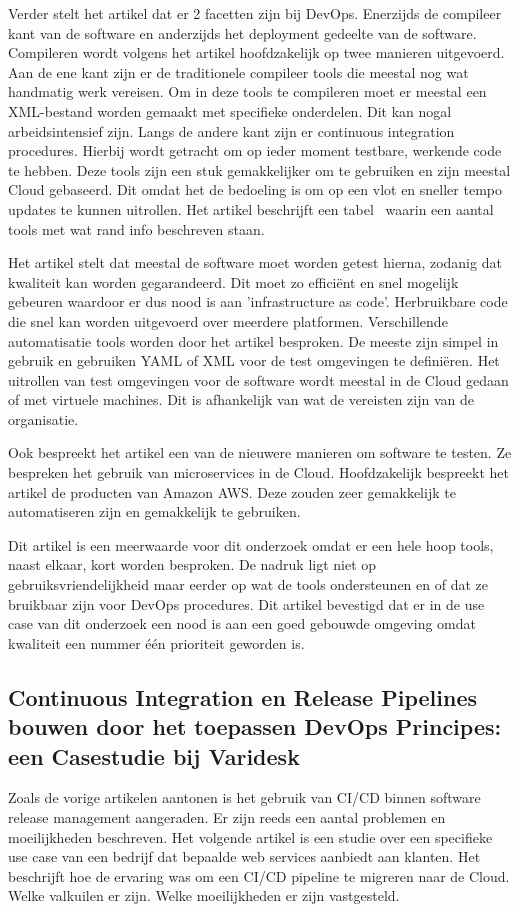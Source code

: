 Verder stelt het artikel \autocite{Ebert2016} dat er 2 facetten zijn bij DevOps. Enerzijds de compileer kant van de software en anderzijds het deployment gedeelte van de software. Compileren wordt volgens het artikel hoofdzakelijk op twee manieren uitgevoerd. Aan de ene kant zijn er de traditionele compileer tools die meestal nog wat handmatig werk vereisen. Om in deze tools te compileren moet er meestal een XML-bestand worden gemaakt met specifieke onderdelen. Dit kan nogal arbeidsintensief zijn. Langs de andere kant zijn er continuous integration procedures. Hierbij wordt getracht om op ieder moment testbare, werkende code te hebben. Deze tools zijn een stuk gemakkelijker om te gebruiken en zijn meestal Cloud gebaseerd. Dit omdat het de bedoeling is om op een vlot en sneller tempo updates te kunnen uitrollen. Het artikel beschrijft een tabel~\textcite{Ebert2016} waarin een aantal tools met wat rand info beschreven staan.

Het artikel \autocite{Ebert2016} stelt dat meestal de software moet worden getest hierna, zodanig dat kwaliteit kan worden gegarandeerd. Dit moet zo efficiënt en snel mogelijk gebeuren waardoor er dus nood is aan 'infrastructure as code'. Herbruikbare code die snel kan worden uitgevoerd over meerdere platformen. Verschillende automatisatie tools worden door het artikel besproken. De meeste zijn simpel in gebruik en gebruiken YAML of XML voor de test omgevingen te definiëren. Het uitrollen van test omgevingen voor de software wordt meestal in de Cloud gedaan of met virtuele machines. Dit is afhankelijk van wat de vereisten zijn van de organisatie. 

Ook bespreekt het artikel \autocite{Ebert2016} een van de nieuwere manieren om software te testen. Ze bespreken het gebruik van microservices in de Cloud. Hoofdzakelijk bespreekt het artikel de producten van Amazon AWS. Deze zouden zeer gemakkelijk te automatiseren zijn en gemakkelijk te gebruiken.

Dit artikel \autocite{Ebert2016} is een meerwaarde voor dit onderzoek omdat er een hele hoop tools, naast elkaar, kort worden besproken. De nadruk ligt niet op gebruiksvriendelijkheid maar eerder op wat de tools ondersteunen en of dat ze bruikbaar zijn voor DevOps procedures. Dit artikel bevestigd dat er in de use case van dit onderzoek een nood is aan een goed gebouwde omgeving omdat kwaliteit een nummer één prioriteit geworden is.

\subsection{Continuous Integration en Release Pipelines bouwen door het toepassen DevOps Principes: een Casestudie bij Varidesk}
Zoals de vorige artikelen aantonen is het gebruik van CI/CD binnen software release management aangeraden. Er zijn reeds een aantal problemen en moeilijkheden beschreven. Het volgende artikel \autocite{Debroy2018} is een studie over een specifieke use case van een bedrijf dat bepaalde web services aanbiedt aan klanten. Het beschrijft hoe de ervaring was om een CI/CD pipeline te migreren naar de Cloud. Welke valkuilen er zijn. Welke moeilijkheden er zijn vastgesteld.

